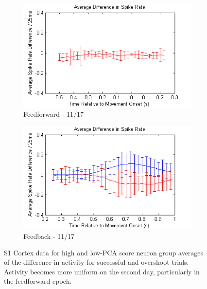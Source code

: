 \documentclass[11pt,a4paper]{article}
\begin{document}
\begin{figure}[h]
{\begin{subfigure}[b]{0.75\textwidth}
                \centering
                \includegraphics[width=\textwidth]{diffs-pre-s1-17}
                \caption{\large Feedforward - 11/17 \\}
                \label{fig:diffs-pre-s1-17}
        \end{subfigure}
        \begin{subfigure}[b]{0.75\textwidth}
                \centering
                \includegraphics[width=\textwidth]{diffs-pos-s1-17}
                \caption{\large Feedback - 11/17 \\}
                \label{fig:diffs-pos-s1-17}
        \end{subfigure}}
        \caption{S1 Cortex data for high and low-PCA score neuron group averages of the difference in activity for successful and overshoot trials. Activity becomes more uniform on the second day, particularly in the feedforward epoch.}\label{fig:diffs-s1}
\end{figure}
\end{document}
